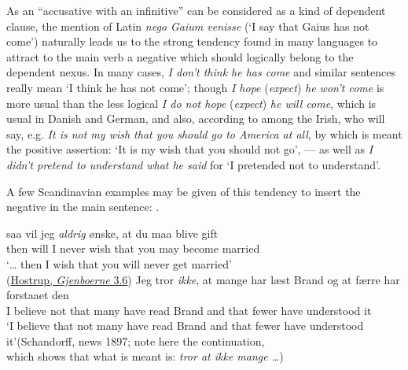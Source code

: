 As an ``accusative with an infinitive'' can be considered as a kind of dependent clause, the mention of Latin \textit{nego Gaium venisse} (`I say that Gaius has not come') naturally leads us to the strong tendency found in many languages to attract to the main verb a negative which should logically belong to the dependent nexus. In many cases, \textit{I don't think he has come} and similar sentences really mean `I think he has not come'; though \textit{I hope} (\textit{expect})\textit{ he won't come} is more usual than the less logical \textit{I do not hope} (\textit{expect})\textit{ he will come}, which is usual in Danish and German, and also, according to \citet[\href{https://archive.org/details/englishaswespeak00joycuoft/page/19/mode/2up?view=theater&q=\%22So+in+our+modern+speech\%22}{20}]{joyce1910english} among the Irish, who will say, e.g. \textit{It is not my wish that you should go to America at all}, by which is meant the positive assertion: `It is my wish that you should not go', --- as well as \textit{I didn't pretend to understand what he said} for `I pretended not to understand'.

A few Scandinavian examples may be given of this tendency to insert the negative in the main sentence: .

\ea \label{ex:05-99}
\ea
\gll saa vil jeg \textit{aldrig} ønske, at du maa blive gift\\
 then will I never wish that you may become married\\
\glt `{\dots} then I wish that you will never get married'\\\hfill(\href{https://tekster.kb.dk/text/adl-texts-hostrup01-shoot-workid54989#idm140699400034704}{Hostrup, \textit{Gjenboerne} 3.6}) %
\ex
\gll Jeg tror \textit{ikke}, at mange har læst Brand og at færre har forstaaet den\\
 I believe not that many have read Brand and that fewer have understood it\\
\glt `I believe that not many have read Brand and that fewer have understood it'\hfill(Schandorff, news 1897; note here the continuation,\\\hfill which shows that what is meant is: \textit{tror at ikke mange {\dots}}) %


